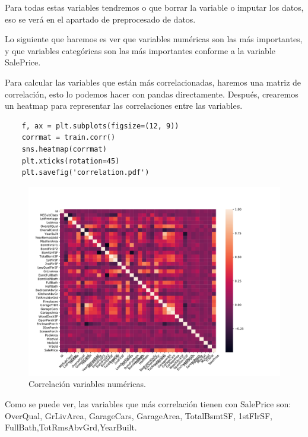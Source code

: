	\vspace{0.06in}
	
	Para todas estas variables tendremos o que borrar la variable o imputar los datos, eso se verá en el apartado de preprocesado de datos.
	
	\vspace{0.06in}
	
	Lo siguiente que haremos es ver que variables numéricas son las más importantes, y que variables categóricas son las más importantes conforme a la variable SalePrice.
	
	\vspace{0.06in}
	Para calcular las variables que están más correlacionadas, haremos una matriz de correlación, esto lo podemos hacer con pandas directamente. Después, crearemos un heatmap para representar las correlaciones entre las variables.
	
	\begin{lstlisting}
	f, ax = plt.subplots(figsize=(12, 9))
	corrmat = train.corr()
	sns.heatmap(corrmat)
	plt.xticks(rotation=45)
	plt.savefig('correlation.pdf')
	\end{lstlisting}
	
	\begin{figure}[H]
		\centering
		\includegraphics[scale=0.5]{imag/correlation.pdf}
		\caption{Correlación variables numéricas.}
		\label{fig:correlation_heatmap}
	\end{figure}

	Como se puede ver, las variables que más correlación tienen con SalePrice son: OverQual, GrLivArea, GarageCars, GarageArea, TotalBsmtSF, 1stFlrSF, FullBath,TotRmsAbvGrd,YearBuilt.
	
